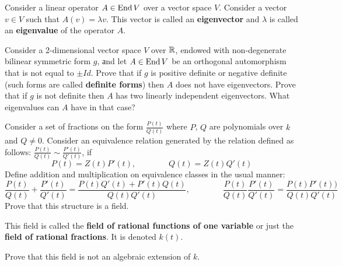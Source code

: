 \documentclass[12pt]{article}
\begin{document}




\begin{opredelenie}
Consider a linear operator $A\in \operatorname{End} V$ over a vector space
$V$. Consider a vector $v\in V$ such that $A(v)= \lambda v$. 
This vector is called an {\bf eigenvector} and $\lambda$ is called an
{\bf eigenvalue} of the operator $A$. 
\end{opredelenie}

\begin{zadacha}
Consider a 2-dimensional vector space $V$ over ${\mathbb R}$,
endowed with non-degenerate bilinear symmetric form $g$, аnd let
$A\in \operatorname{End} V$ be an orthogonal automorphism that is not equal to $\pm
Id$. Prove that if $g$ is positive definite or negative definite
(such forms are called {\bf definite forms})
then $A$ does not have eigenvectors. Prove that if $g$ is not definite
then $A$ has two linearly independent eigenvectors. What eigenvalues
can $A$ have in that case?
\end{zadacha}

\begin{zadacha}
Consider a set of fractions on the form $\frac{P(t)}{Q(t)}$ where
$P$, $Q$ are polynomials over $k$ and $Q\neq 0$. 
Consider an equivalence relation generated by the relation defined as
follows: 
$\frac{P(t)}{Q(t)}\sim\frac{P'(t)}{Q'(t)}$, if
\[ 
P(t) = Z(t) P'(t), \qquad\qquad Q(t) = Z(t) Q'(t)
\]
Define addition and multiplication on equivalence classes in the usual
manner:
\[ 
 \frac{P(t)}{Q(t)}+\frac{P'(t)}{Q'(t)}= 
\frac{P(t)Q'(t) + P'(t) Q(t)}{Q(t)Q'(t)}, \qquad\qquad
\frac{P(t)}{Q(t)}\frac{P'(t)}{Q'(t)} = \frac{P(t) P'(t))}{Q(t)Q'(t)}
\]
Prove that this structure is a field.
\end{zadacha}

\begin{opredelenie}
This field is called the {\bf field of rational functions of one
  variable} or just the  {\bf field of rational fractions}. It is
denoted $k(t)$.
\end{opredelenie}

\begin{zadacha}
Prove that this field is not an algebraic extension of $k$.
\end{zadacha}
\end{document}
